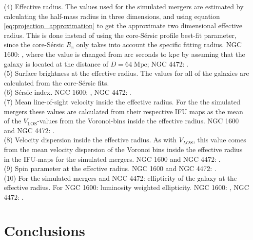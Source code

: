 \documentclass[english, twoside]{HYgradu}
\begin{document}
\begin{table}
{	(4) Effective radius. The values used for the simulated mergers are estimated by calculating the half-mass radius in three dimensions, and using equation \ref{eq:projection_approximation} to get the approximate two dimensional effective radius. This is done instead of using the core-Sérsic profile best-fit parameter, since the core-Sérsic $R_e$ only takes into account the specific fitting radius. NGC 1600: \cite{Thomas2016}, where the value is changed from arc seconds to kpc by assuming that the galaxy is located at the distance of $D = 64 \; \mathrm{Mpc}$; NGC 4472: \cite{Veale2017veldisp}. \\
	(5) Surface brightness at the effective radius. The values for all of the galaxies are calculated from the core-Sérsic fits. \\
	(6) Sérsic index. NGC 1600: \cite{Thomas2016}, NGC 4472: \cite{Rusli2013}. \\
	(7) Mean line-of-sight velocity inside the effective radius. For the the simulated mergers these values are calculated from their respective IFU maps as the mean of the $V_\mathrm{LOS}$-values from the Voronoi-bins inside the effective radius. NGC 1600 and NGC 4472: \cite{Bender1994}. \\
	(8) Velocity dispersion inside the effective radius. As with $V_{LOS}$, this value comes from the mean velocity dispersion of the Voronoi bins inside the effective radius in the IFU-maps for the simulated mergers. NGC 1600 and NGC 4472: \cite{Veale2017veldisp}.\\
	(9) Spin parameter at the effective radius. NGC 1600 and NGC 4472: \citep{Veale2018lambda}. \\
	(10) For the simulated mergers and NGC 4472: ellipticity of the galaxy at the effective radius. For NGC 1600: luminosity weighted ellipticity. NGC 1600: \cite{Goullaud2018}, NGC 4472: \cite{Emsellem2011}.
	}
	\label{table:snap6_vs_NGC1600}
\end{table}


\chapter{Conclusions} \label{chapter:5}
\end{document}
